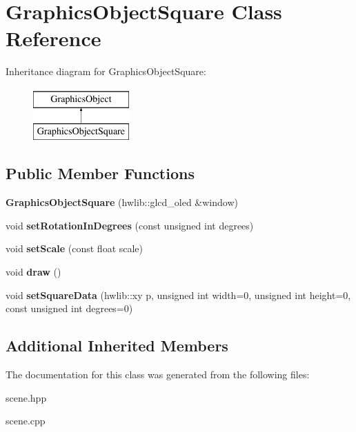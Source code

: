 \hypertarget{class_graphics_object_square}{}\section{Graphics\+Object\+Square Class Reference}
\label{class_graphics_object_square}
Inheritance diagram for Graphics\+Object\+Square\+:\begin{figure}[H]
\begin{center}
\leavevmode
\includegraphics[height=2.000000cm]{class_graphics_object_square}
\end{center}
\end{figure}
\subsection*{Public Member Functions}
\begin{DoxyCompactItemize}
\item 
\mbox{\label{class_graphics_object_square_af935eee79aab68a59befdf102f7f32a8}} 
{\bfseries Graphics\+Object\+Square} (hwlib\+::glcd\+\_\+oled \&window)
\item 
\mbox{\label{class_graphics_object_square_afb2753b58b896a13f90e3269898a8a1d}} 
void {\bfseries set\+Rotation\+In\+Degrees} (const unsigned int degrees)
\item 
\mbox{\label{class_graphics_object_square_a92fc26cdb800858992f505a57f31e3aa}} 
void {\bfseries set\+Scale} (const float scale)
\item 
\mbox{\label{class_graphics_object_square_a7e494e475f4f47a77e8dc0eead6136bd}} 
void {\bfseries draw} ()
\item 
\mbox{\label{class_graphics_object_square_abc8b9bacc687ce180f6a03ea6c8ee69b}} 
void {\bfseries set\+Square\+Data} (hwlib\+::xy p, unsigned int width=0, unsigned int height=0, const unsigned int degrees=0)
\end{DoxyCompactItemize}
\subsection*{Additional Inherited Members}


The documentation for this class was generated from the following files\+:\begin{DoxyCompactItemize}
\item 
scene.\+hpp\item 
scene.\+cpp\end{DoxyCompactItemize}
